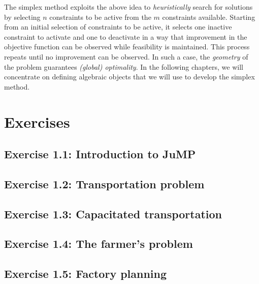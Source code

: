 The simplex method exploits the above idea to \emph{heuristically} search for solutions by selecting $n$ constraints to be active from the $m$ constraints available. Starting from an initial selection of constraints to be active, it selects one inactive constraint to activate and one to deactivate in a way that improvement in the objective function can be observed while feasibility is maintained. This process repeats until no improvement can be observed. In such a case, the \emph{geometry} of the problem guarantees \emph{(global) optimality}. In the following chapters, we will concentrate on defining algebraic objects that we will use to develop the simplex method.


\vfill
\pagebreak

\section{Exercises}

\subsection*{Exercise 1.1: Introduction to JuMP}


\subsection*{Exercise 1.2: Transportation problem \cite{kwon2019julia}}


\subsection*{Exercise 1.3: Capacitated transportation}


\subsection*{Exercise 1.4: The farmer's problem \cite{birge2011introduction}}


\vfill
\pagebreak
\subsection*{Exercise 1.5: Factory planning \cite{williams2013model}}





